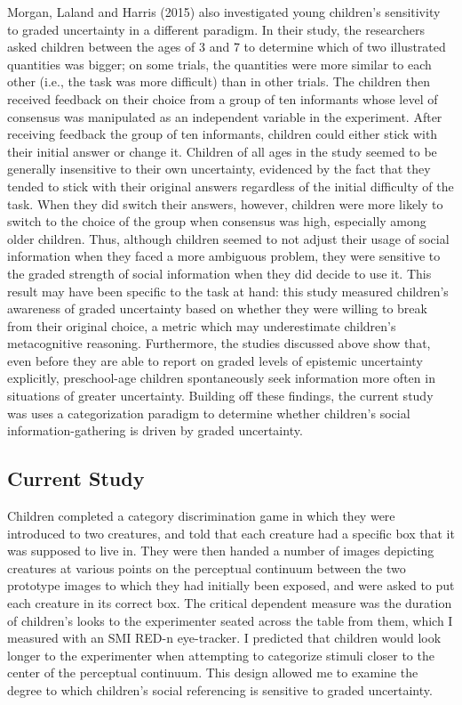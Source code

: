 \documentclass[floatsintext,man]{apa6}
\theoremstyle{definition}
\theoremstyle{definition}
\theoremstyle{definition}
\theoremstyle{remark}
\begin{document}
Morgan, Laland and Harris (2015) also investigated young children's
sensitivity to graded uncertainty in a different paradigm. In their
study, the researchers asked children between the ages of 3 and 7 to
determine which of two illustrated quantities was bigger; on some
trials, the quantities were more similar to each other (i.e., the task
was more difficult) than in other trials. The children then received
feedback on their choice from a group of ten informants whose level of
consensus was manipulated as an independent variable in the experiment.
After receiving feedback the group of ten informants, children could
either stick with their initial answer or change it. Children of all
ages in the study seemed to be generally insensitive to their own
uncertainty, evidenced by the fact that they tended to stick with their
original answers regardless of the initial difficulty of the task. When
they did switch their answers, however, children were more likely to
switch to the choice of the group when consensus was high, especially
among older children. Thus, although children seemed to not adjust their
usage of social information when they faced a more ambiguous problem,
they were sensitive to the graded strength of social information when
they did decide to use it. This result may have been specific to the
task at hand: this study measured children's awareness of graded
uncertainty based on whether they were willing to break from their
original choice, a metric which may underestimate children's
metacognitive reasoning. Furthermore, the studies discussed above show
that, even before they are able to report on graded levels of epistemic
uncertainty explicitly, preschool-age children spontaneously seek
information more often in situations of greater uncertainty. Building
off these findings, the current study was uses a categorization paradigm
to determine whether children's social information-gathering is driven
by graded uncertainty.

\subsection{Current Study}\label{current-study}

Children completed a category discrimination game in which they were
introduced to two creatures, and told that each creature had a specific
box that it was supposed to live in. They were then handed a number of
images depicting creatures at various points on the perceptual continuum
between the two prototype images to which they had initially been
exposed, and were asked to put each creature in its correct box. The
critical dependent measure was the duration of children's looks to the
experimenter seated across the table from them, which I measured with an
SMI RED-n eye-tracker. I predicted that children would look longer to
the experimenter when attempting to categorize stimuli closer to the
center of the perceptual continuum. This design allowed me to examine
the degree to which children's social referencing is sensitive to graded
uncertainty.
\end{document}
